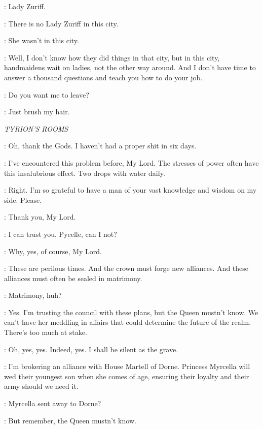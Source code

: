 \SHAE: Lady Zuriff. 

\SANSA: There is no Lady Zuriff in this city. 

\SHAE: She wasn't in this city. 

\SANSA: Well, I don't know how they did things in that city, but in this city, handmaidens wait on ladies, not the other way around. And I don't have time to answer a thousand questions and teach you how to do your job. 

\SHAE: Do you want me to leave? 

\SANSA: Just brush my hair. 



\scene

\textit{TYRION'S ROOMS} 


\TYRION: Oh, thank the Gods. I haven't had a proper shit in six days. 

\PYCELLE: I've encountered this problem before, My Lord. The stresses of power often have this insalubrious effect. Two drops with water daily. 

\TYRION: Right. I'm so grateful to have a man of your vast knowledge and wisdom on my side. Please. 


\PYCELLE: Thank you, My Lord. 

\TYRION: I can trust you, Pycelle, can I not? 

\PYCELLE: Why, yes, of course, My Lord. 

\TYRION: These are perilous times. And the crown must forge new alliances. And these alliances must often be sealed in matrimony. 

\PYCELLE: Matrimony, huh? 

\TYRION: Yes. I'm trusting the council with these plans, but the Queen mustn't know. We can't have her meddling in affairs that could determine the future of the realm. There's too much at stake. 

\PYCELLE: Oh, yes, yes. Indeed, yes. I shall be silent as the grave. 

\TYRION: I'm brokering an alliance with House Martell of Dorne. Princess Myrcella will wed their youngest son when she comes of age, ensuring their loyalty and their army should we need it. 

\PYCELLE: Myrcella sent away to Dorne? 

\TYRION: But remember, the Queen mustn't know. 

